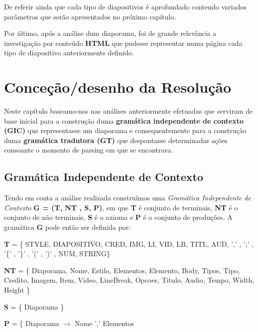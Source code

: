 \documentclass[11pt,a4paper]{report}
\begin{document}
De referir ainda que cada tipo de diapositivos é aprofundado contendo variados parâmetros que serão apresentados no próximo capítulo.

Por último, após a análise dum diaporama, foi de grande relevância a investigação por conteúdo \textbf{HTML} que pudesse representar numa página cada tipo de diapositivo anteriormente definido.

\chapter{Conceção/desenho da Resolução}
\label{chap:concecao}

Neste capítulo baseamo-nos nas análises anteriormente efetuadas que serviram de base inicial para a construção duma \textbf{gramática independente de contexto (GIC)} que representasse um diaporama e consequentemente para a construção duma \textbf{gramática tradutora (GT)} que despontasse determinadas ações consoante o momento de parsing em que se encontrava.


\section{Gramática Independente de Contexto}

Tendo em conta a análise realizada construímos uma \textit{Gramática Independente de Contexto} \textbf{G = (T, NT , S, P)}, em que \textbf{T} é conjunto de terminais, \textbf{NT} é o conjunto de não terminais, \textbf{S} é o axioma e \textbf{P} é o conjunto de produções. A gramática \textbf{G} pode então ser definida por:

\vspace{0.5cm}

\textbf{T} = \{ STYLE, DIAPOSITIVO, CRED, IMG, LI, VID, LB, TITL, AUD, ',' , ';' , '\{' , '\}' , '(' , ')' , NUM, STRING\}

\vspace{0.5cm}

\textbf{NT} = \{ Diaporama, Nome, Estilo, Elementos, Elemento, Body, Tipos, Tipo, Credito, Imagem, Item, Video, LineBreak, Opcoes, Titulo, Audio, Tempo, Width, Height \}

\vspace{0.5cm}

\textbf{S} = \{ Diaporama \}

\vspace{0.5cm}

\textbf{P} = \{ Diaporama $\rightarrow$ Nome ',' Elementos
\end{document}

